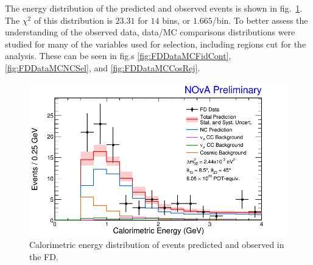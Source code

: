 The energy distribution of the predicted and observed events is shown in fig.~\ref{fig:FDDataMCECal}. The $\chi^2$ of this distribution is $23.31$ for $14$ bins, or $1.665$/bin. To better assess the understanding of the observed data, data/MC comparisons distributions were studied for many of the variables used for selection, including regions cut for the analysis. These can be seen in fig.s \ref{fig:FDDataMCFidCont}, \ref{fig:FDDataMCNCSel}, and \ref{fig:FDDataMCCosRej}.
\begin{figure}[htbp]
  \centering
  \includegraphics[width=1\textwidth]{figures/FDDataMC/cCalEFDAllStSy.png}
  \caption[FD Data and MC Energy Distribution]{Calorimetric energy distribution of events predicted and observed in the FD.}
  \label{fig:FDDataMCECal}
\end{figure}

